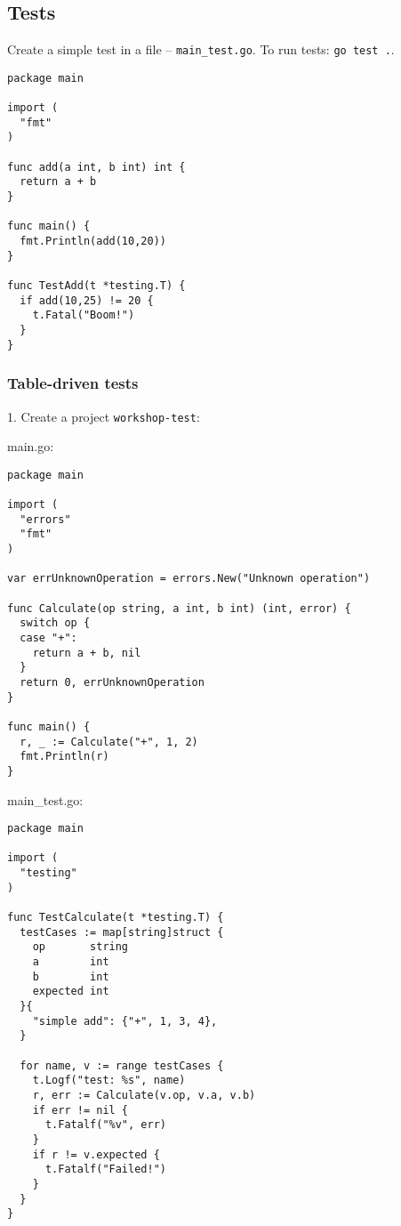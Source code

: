\documentclass[11pt, letterpaper]{article}
\begin{document}
\pagebreak
\subsection{Tests}

Create a simple test in a file -- \verb|main_test.go|. To run tests: \verb|go test .|.

\begin{verbatim}
package main

import (
  "fmt"
)

func add(a int, b int) int {
  return a + b
}

func main() {
  fmt.Println(add(10,20))
}

func TestAdd(t *testing.T) {
  if add(10,25) != 20 {
    t.Fatal("Boom!")
  }
}
\end{verbatim}

\pagebreak
\subsubsection{Table-driven tests}

1. Create a project \verb|workshop-test|:

main.go:

\begin{verbatim}
package main

import (
  "errors"
  "fmt"
)

var errUnknownOperation = errors.New("Unknown operation")

func Calculate(op string, a int, b int) (int, error) {
  switch op {
  case "+":
    return a + b, nil
  }
  return 0, errUnknownOperation
}

func main() {
  r, _ := Calculate("+", 1, 2)
  fmt.Println(r)
}
\end{verbatim}

main\_test.go:

\begin{verbatim}
package main

import (
  "testing"
)

func TestCalculate(t *testing.T) {
  testCases := map[string]struct {
    op       string
    a        int
    b        int
    expected int
  }{
    "simple add": {"+", 1, 3, 4},
  }

  for name, v := range testCases {
    t.Logf("test: %s", name)
    r, err := Calculate(v.op, v.a, v.b)
    if err != nil {
      t.Fatalf("%v", err)
    }
    if r != v.expected {
      t.Fatalf("Failed!")
    }
  }
}
\end{verbatim}
\end{document}
